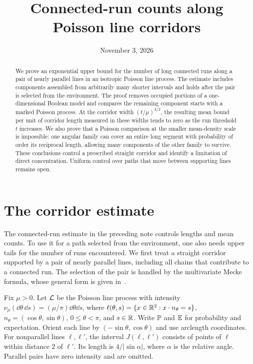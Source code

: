 \documentclass[11pt,letterpaper]{article}
\title{Connected-run counts along Poisson line corridors}
\author{}
\date{November 3, 2026}
\begin{document}
\maketitle
\begin{abstract}
We prove an exponential upper bound for the number of long connected runs along a pair of nearly parallel lines in an isotropic Poisson line process. The estimate includes components assembled from arbitrarily many shorter intervals and holds after the pair is selected from the environment. The proof removes occupied portions of a one-dimensional Boolean model and compares the remaining component starts with a marked Poisson process. At the corridor width $(t/\mu)^{3/2}$, the resulting mean bound per unit of corridor length measured in these widths tends to zero as the run threshold $t$ increases. We also prove that a Poisson comparison at the smaller mean-density scale is impossible: one angular family can cover an entire long segment with probability of order its reciprocal length, allowing many components of the other family to survive. These conclusions control a prescribed straight corridor and identify a limitation of direct concentration. Uniform control over paths that move between supporting lines remains open.
\end{abstract}

\section{The corridor estimate}

The connected-run estimate in the preceding note controls lengths and mean counts. To use it for a path selected from the environment, one also needs upper tails for the number of runs encountered. We first treat a straight corridor supported by a pair of nearly parallel lines, including all chains that contribute to a connected run. The selection of the pair is handled by the multivariate Mecke formula, whose general form is given in~\cite[Theorem~4.4]{LP17}.

Fix $\mu>0$. Let $\cL$ be the Poisson line process with intensity $\nu_\mu(\dd\theta\,\dd s)=(\mu/\pi)\dd\theta\dd s$, where $\ell(\theta,s)=\{x\in\R^2:x\cdot n_\theta=s\}$, $n_\theta=(\cos\theta,\sin\theta)$, $0\le\theta<\pi$, and $s\in\R$. Write $\P$ and $\E$ for probability and expectation. Orient each line by $(-\sin\theta,\cos\theta)$ and use arclength coordinates. For nonparallel lines $\ell,\ell'$, the interval $J(\ell,\ell')$ consists of points of $\ell$ within distance $2$ of $\ell'$. Its length is $4/|\sin\alpha|$, where $\alpha$ is the relative angle. Parallel pairs have zero intensity and are omitted.
\end{document}
